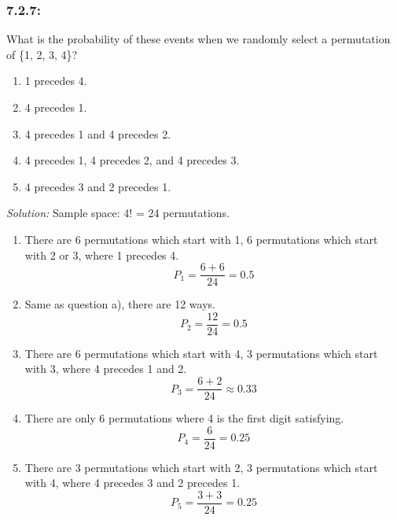 \documentclass[a4paper]{article}
\begin{document}
\subsubsection*{7.2.7:}
What is the probability of these events when we randomly select a permutation of \{1, 2, 3, 4\}?
\begin{enumerate}[label = \textbf{\alph*)}]
	\item 1 precedes 4.
	\item 4 precedes 1.
	\item 4 precedes 1 and 4 precedes 2.
	\item 4 precedes 1, 4 precedes 2, and 4 precedes 3.
	\item 4 precedes 3 and 2 precedes 1.
\end{enumerate}
\emph{Solution:}
Sample space: 4! = 24 permutations.
\begin{enumerate}[label = \textbf{\alph*)}]
	\item There are 6 permutations which start with 1, 6 permutations which start with 2 or 3, where 1 precedes 4.
	      \begin{equation*}
		      P_1 =  \frac{6+6}{24} = 0.5
	      \end{equation*}
	\item Same as question a), there are 12 ways.
	      \begin{equation*}
		      P_2 = \frac{12}{24} = 0.5
	      \end{equation*}
	\item There are 6 permutations which start with 4, 3 permutations which start with 3, where 4 precedes 1 and 2.
	      \begin{equation*}
		      P_3 = \frac{6+2}{24} \approx 0.33
	      \end{equation*}
	\item There are only 6 permutations where 4 is the first digit satisfying.
	      \begin{equation*}
		      P_4 = \frac{6}{24} = 0.25
	      \end{equation*}
	\item There are 3 permutations which start with 2, 3 permutations which start with 4, where 4 precedes 3 and 2 precedes 1.
	      \begin{equation*}
		      P_5 =  \frac{3+3}{24} = 0.25
	      \end{equation*}
\end{enumerate}
\end{document}
